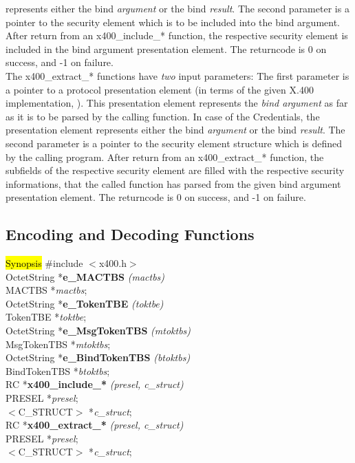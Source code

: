 represents either the bind {\em argument}
or the bind {\em result}.
The second parameter is a pointer to the security element
which is to be included into the bind argument.
After return from an x400\_include\_* function,
the respective security element is included in the
bind argument presentation element.
The returncode is 0 on success, and -1 on failure.
\\[1ex]
The x400\_extract\_* functions
have {\em two} input parameters:
The first parameter is a pointer to a protocol presentation element
(in terms of the given X.400 implementation,
).
This presentation element
represents the {\em bind argument}
as far as it is to be parsed by the calling function.
In case of the Credentials, the presentation element
represents either the bind {\em argument}
or the bind {\em result}.
The second parameter is a pointer to the security element structure
which is defined by the calling program.
After return from an x400\_extract\_* function,
the subfields of
the respective security element are filled
with the respective security informations,
that the called function has parsed from the given
bind argument presentation element.
The returncode is 0 on success, and -1 on failure.

\subsection{Encoding and Decoding Functions}
\label{x4_encdec}
\hl{Synopsis}
\#include $<$x400.h$>$ \\ [1ex]
OctetString *{\bf e\_MACTBS} {\em (mactbs)} \\
MACTBS *{\em mactbs}; \\ [1ex]
OctetString *{\bf e\_TokenTBE} {\em (toktbe)} \\
TokenTBE *{\em toktbe}; \\ [1ex]
OctetString *{\bf e\_MsgTokenTBS} {\em (mtoktbs)} \\
MsgTokenTBS *{\em mtoktbs}; \\ [1ex]
OctetString *{\bf e\_BindTokenTBS} {\em (btoktbs)} \\
BindTokenTBS *{\em btoktbs}; \\ [1ex]
RC *{\bf x400\_include\_*} {\em (presel, c\_struct)} \\
PRESEL *{\em presel}; \\
$<$C\_STRUCT$>$ *{\em c\_struct}; \\ [1ex]
RC *{\bf x400\_extract\_*} {\em (presel, c\_struct)} \\
PRESEL *{\em presel}; \\
$<$C\_STRUCT$>$ *{\em c\_struct}; \\ [1ex]

